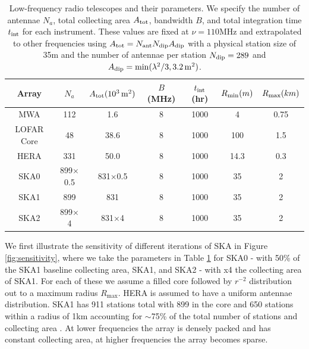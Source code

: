 \documentclass{PoS}
\begin{document}
\begin{table}[htdp]
\caption{Low-frequency radio telescopes and their parameters.  We specify the number of antennae $N_a$, total collecting area $A_{\rm tot}$, bandwidth $B$, and total integration time $t_{\rm int}$ for each instrument. These values are fixed at $\nu=110$MHz and extrapolated to other frequencies using $A_{\rm tot}=N_{\rm ant}N_{\rm dip}A_{\rm dip}$ with a physical station size of 35m and the number of antennae per station $N_{\rm dip}=289$ and $A_{\rm dip}=\min(\lambda^2/3,3.2\,{ \rm m^2})$.}
\begin{center}
\begin{tabular}{ccccccc}
\hline
\hline
Array & $N_a$ & $A_{\rm tot}(10^3\,{\rm m^2})$ & $B$ (MHz) & $t_{\rm int}$ (hr)& $R_{\rm min} (m)$ & $R_{\rm max} (km)$\\
\hline
MWA & 112 & 1.6  & 8 & 1000 & 4 & 0.75\\
LOFAR Core & 48 & 38.6  & 8 & 1000 & 100 & 1.5\\
HERA & 331 & 50.0  & 8 & 1000 & 14.3 & 0.3\\
SKA0 & 899$\times$0.5 & 831$\times$0.5  & 8 & 1000 & 35 & 2\\
SKA1 & 899 & 831  & 8 & 1000 & 35 & 2\\
SKA2 & 899$\times$4 & 831$\times$4 & 8 & 1000 & 35 & 2\\
\hline
\hline
\end{tabular}
\end{center}
\label{tab:telescopes}
\end{table}%

We first illustrate the sensitivity of different iterations of SKA in Figure \ref{fig:sensitivity}, where we take the parameters in Table \ref{tab:telescopes} for SKA0 - with 50\% of the SKA1 baseline collecting area, SKA1, and SKA2 - with x4 the collecting area of SKA1. For each of these we assume a filled core followed by $r^{-2}$ distribution out to a maximum radius $R_{\max}$. HERA is assumed to have a uniform antennae distribution. SKA1 has 911 stations total with 899 in the core and 650 stations within a radius of 1km accounting for $\sim$75\% of the total number of stations and collecting area \citep{Dewdney:2013}. At lower frequencies the array is densely packed and has constant collecting area, at higher frequencies the array becomes sparse.
\end{document}
